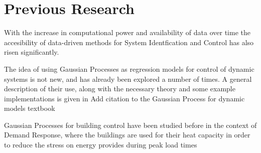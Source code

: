 \section{Previous Research}
With the increase in computational power and availability of data  over time the
accesibility of data-driven methods for System Identfication and Control has
also risen significantly. 

The idea of using Gaussian Processes as regression models for control of dynamic
systems is not new, and has already been explored a number of times. A general
description of their use, along with the necessary theory and some example
implementations is given in {\color{red} Add citation to the Gaussian Process
for dynamic models textbook}

Gaussian Processes for building control have been studied before in the context
of Demand Response, {\color{orange} where the buildings are used for their heat
capacity in order to reduce the stress on energy provides during peak load times}

{\color{red}\lipsum[1]}


{\color{red}\lipsum[2-3]}
\clearpage
